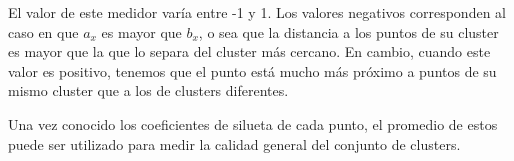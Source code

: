 El valor de este medidor varía entre -1 y 1.
Los valores negativos corresponden al caso en que $a_x$ es mayor que $b_x$, o sea que la distancia a los puntos de su cluster es mayor que la que lo separa del cluster más cercano.
En cambio, cuando este valor es positivo, tenemos que el punto está mucho más próximo a puntos de su mismo cluster que a los de clusters diferentes.

Una vez conocido los coeficientes de silueta de cada punto, el promedio de estos puede ser utilizado para medir la calidad general del conjunto de clusters.

